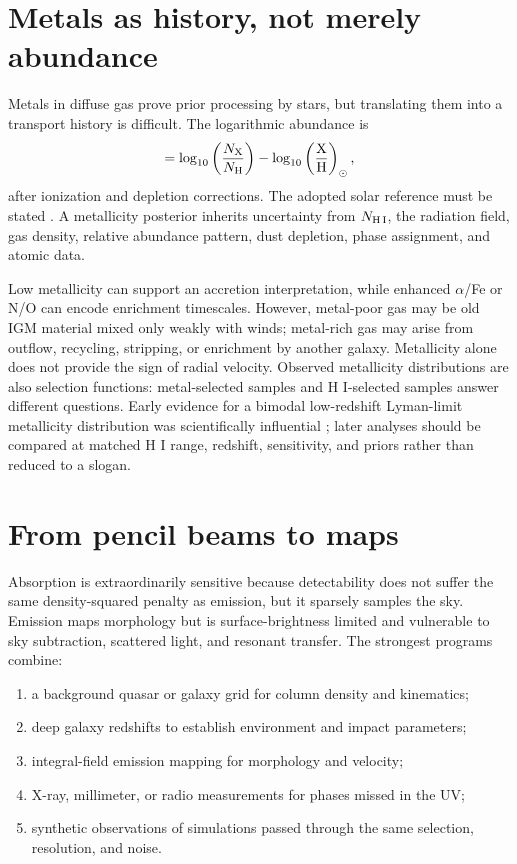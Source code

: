 \section{Metals as history, not merely abundance}

Metals in diffuse gas prove prior processing by stars, but translating them
into a transport history is difficult. The logarithmic abundance is
\begin{equation}
 [{\rm X/H}]=
 \log_{10}\left(\frac{N_{\rm X}}{N_{\rm H}}\right)
 -\log_{10}\left(\frac{\rm X}{\rm H}\right)_{\odot},
 \label{eq:metallicity}
\end{equation}
after ionization and depletion corrections. The adopted solar reference
must be stated \citep{Asplund2021}. A metallicity posterior inherits
uncertainty from $N_{\rm H\,I}$, the radiation field, gas density, relative
abundance pattern, dust depletion, phase assignment, and atomic data.

Low metallicity can support an accretion interpretation, while enhanced
$\alpha$/Fe or N/O can encode enrichment timescales. However, metal-poor gas
may be old IGM material mixed only weakly with winds; metal-rich gas may arise
from outflow, recycling, stripping, or enrichment by another galaxy.
Metallicity alone does not provide the sign of radial velocity. Observed
metallicity distributions are also selection functions: metal-selected
samples and H I-selected samples answer different questions. Early evidence
for a bimodal low-redshift Lyman-limit metallicity distribution was
scientifically influential \citep{Lehner2013}; later analyses should be
compared at matched H I range, redshift, sensitivity, and priors rather than
reduced to a slogan.

\section{From pencil beams to maps}

Absorption is extraordinarily sensitive because detectability does not suffer
the same density-squared penalty as emission, but it sparsely samples the sky.
Emission maps morphology but is surface-brightness limited and vulnerable to
sky subtraction, scattered light, and resonant transfer. The strongest
programs combine:
\begin{enumerate}
  \item a background quasar or galaxy grid for column density and kinematics;
  \item deep galaxy redshifts to establish environment and impact parameters;
  \item integral-field emission mapping for morphology and velocity;
  \item X-ray, millimeter, or radio measurements for phases missed in the UV;
  \item synthetic observations of simulations passed through the same
  selection, resolution, and noise.
\end{enumerate}

